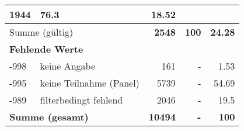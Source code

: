 \begin{longtable}{lXrrr}
       \num{1944} &
       \num[round-mode=places,round-precision=2]{76.3} &
         \num[round-mode=places,round-precision=2]{18.52} \\
     \midrule
     \multicolumn{2}{l}{Summe (gültig)} &
       \textbf{\num{2548}} &
     \textbf{\num{100}} &
       \textbf{\num[round-mode=places,round-precision=2]{24.28}} \\
     \multicolumn{5}{l}{\textbf{Fehlende Werte}}\\
       -998 &
       keine Angabe &
         \num{161} &
        - &
         \num[round-mode=places,round-precision=2]{1.53} \\
       -995 &
       keine Teilnahme (Panel) &
         \num{5739} &
        - &
         \num[round-mode=places,round-precision=2]{54.69} \\
       -989 &
       filterbedingt fehlend &
         \num{2046} &
        - &
         \num[round-mode=places,round-precision=2]{19.5} \\
     \midrule
     \multicolumn{2}{l}{\textbf{Summe (gesamt)}} &
          \textbf{\num{10494}} &
        \textbf{-} &
        \textbf{\num{100}} \\
     \bottomrule
     \end{longtable}
     

